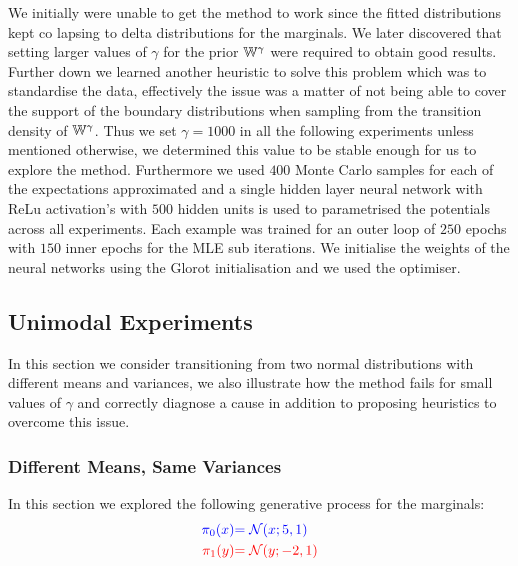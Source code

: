 \documentclass[a4paper,12pt,twoside,openright]{report}
\theoremstyle{definition}
\begin{document}
We initially were unable to get the method \cite{pavon2018data} to work since the fitted distributions kept co lapsing to delta distributions for the marginals. We later discovered that setting larger values of $\gamma$ for the prior $\mathbb{W}^{\gamma}$ were required to obtain good results. Further down we learned another heuristic to solve this problem which was to standardise the data, effectively the issue was a matter of not being able to cover the support of the boundary distributions when sampling from the transition density of $\mathbb{W}^{\gamma}$. Thus we set $\gamma=1000$ in all the following experiments unless mentioned otherwise, we determined this value to be stable enough for us to explore the method. Furthermore we used $400$ Monte Carlo  samples for each of the expectations approximated and a single hidden layer neural network \citep{lecun2015deep} with ReLu activation's with $500$ hidden units is used to parametrised the potentials across all experiments. Each example was trained for an outer loop of $250$ epochs with $150$ inner epochs for the MLE sub iterations. We initialise the weights of the neural networks using the Glorot initialisation \citep{glorot2010understanding} and we used the \cite{duchi2011adaptive} optimiser.

\subsection{Unimodal Experiments}

In this section we consider transitioning from two normal distributions with different means and variances, we also illustrate how the method fails for small values of $\gamma$ and correctly diagnose a cause in addition to proposing heuristics to overcome this issue. 
\subsubsection{Different Means, Same Variances}

In this section we explored the following generative process for the marginals:
\begin{align*}
\color{blue}{\pi_0(x)} &\color{blue}{= {\mathcal{N}}(x; 5,  1)} \\
    \color{red}{\pi_1(y)} &\color{red}{= {\mathcal{N}}(y; -2, 1)} 
\end{align*}
\end{document}

